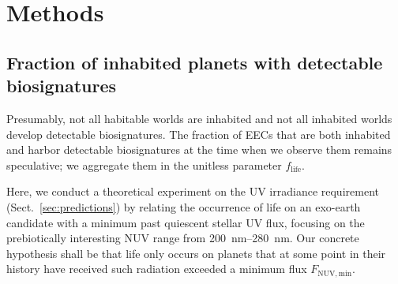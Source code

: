 \documentclass[twocolumn,twocolappendix,linenumbers]{aastex631}
\begin{document}
\section{Methods}
\label{sec:hypotests}


\subsection{Fraction of inhabited planets with detectable biosignatures}
Presumably, not all habitable worlds are inhabited and not all inhabited worlds develop detectable biosignatures.
The fraction of \glspl{EEC} that are both inhabited and harbor detectable biosignatures at the time when we observe them remains speculative; we aggregate them in the unitless parameter $f_\mathrm{life}$.

%
%
Here, we conduct a theoretical experiment on the UV irradiance requirement (Sect.~\ref{sec:predictions}) by relating the occurrence of life on an exo-earth candidate with a minimum past quiescent stellar UV flux, focusing on the prebiotically interesting \gls{NUV} range from \SIrange{200}{280}{\nano\meter}.   %
Our concrete hypothesis shall be that life only occurs on planets that at some point in their history have received such radiation exceeded a minimum flux $F_\mathrm{NUV, min}$.
\end{document}

